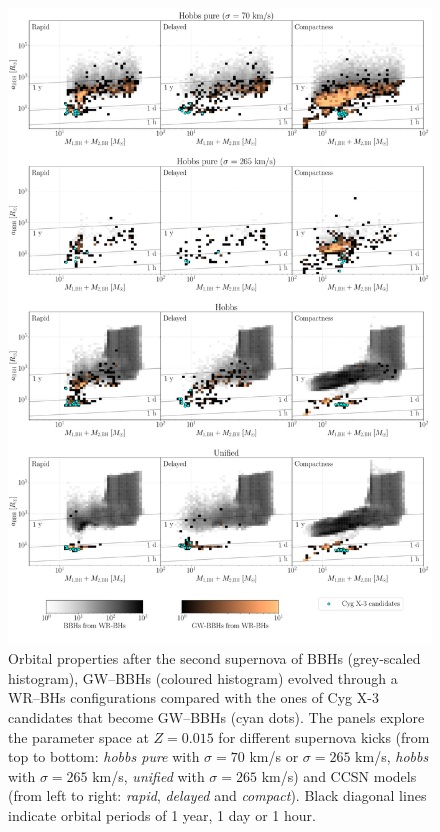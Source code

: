 \documentclass[a4paper,titlepage]{book}     	%
\begin{document}
\begin{appendices}
\begin{figure}
	\centering
	\includegraphics[width=\textwidth]{./images/kickcompare_rem_015.pdf}	
	\caption{Orbital properties after the second supernova of BBHs (grey-scaled histogram), GW--BBHs (coloured histogram) evolved through a WR--BHs configurations compared with the ones of Cyg X-3 candidates that become GW--BBHs (cyan dots). The panels explore the parameter space at $Z=0.015$ for different supernova kicks (from top to bottom: \emph{hobbs pure} with $\sigma = 70$ km/s or $\sigma = 265$ km/s, \emph{hobbs} with $\sigma = 265$ km/s, \emph{unified} with $\sigma = 265$ km/s) and CCSN models (from left to right: \emph{rapid}, \emph{delayed} and \emph{compact}). Black diagonal lines indicate orbital periods of 1 year, 1 day or 1 hour.}\label{fig:resultsCygX3rembinaries}
\end{figure}


\end{appendices}
\end{document}
